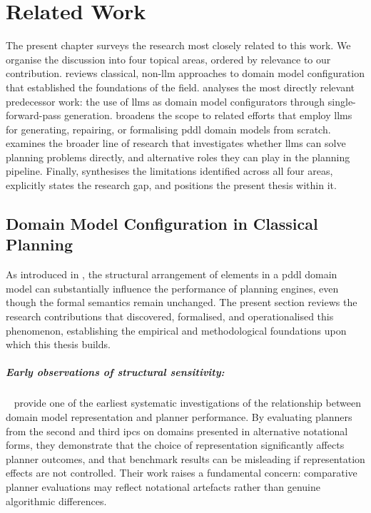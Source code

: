 
\chapter{Related Work}\label{ch:related_work}

The present chapter surveys the research most closely related to this work.
We organise the discussion into four topical areas, ordered by relevance to our contribution.
 reviews classical, non-\gls{llm} approaches to domain model configuration that established the foundations of the field.
 analyses the most directly relevant predecessor work: the use of \glspl{llm} as domain model configurators through single-forward-pass generation.
 broadens the scope to related efforts that employ \glspl{llm} for generating, repairing, or formalising \gls{pddl} domain models from scratch.
 examines the broader line of research that investigates whether \glspl{llm} can solve planning problems directly, and alternative roles they can play in the planning pipeline.
Finally,  synthesises the limitations identified across all four areas, explicitly states the research gap, and positions the present thesis within it.

\section{Domain Model Configuration in Classical Planning}
\label{sec:rw:classical_config}

As introduced in , the structural arrangement of elements in a \gls{pddl} domain model can substantially influence the performance of planning engines, even though the formal semantics remain unchanged.
The present section reviews the research contributions that discovered, formalised, and operationalised this phenomenon, establishing the empirical and methodological foundations upon which this thesis builds.

\paragraph{Early observations of structural sensitivity:}
\citeauthor{HoweDahlman2002}~\cite{HoweDahlman2002} provide one of the earliest systematic investigations of the relationship between domain model representation and planner performance.
By evaluating planners from the second and third \glspl{ipc} on domains presented in alternative notational forms, they demonstrate that the choice of representation significantly affects planner outcomes, and that benchmark results can be misleading if representation effects are not controlled.
Their work raises a fundamental concern: comparative planner evaluations may reflect notational artefacts rather than genuine algorithmic differences.

